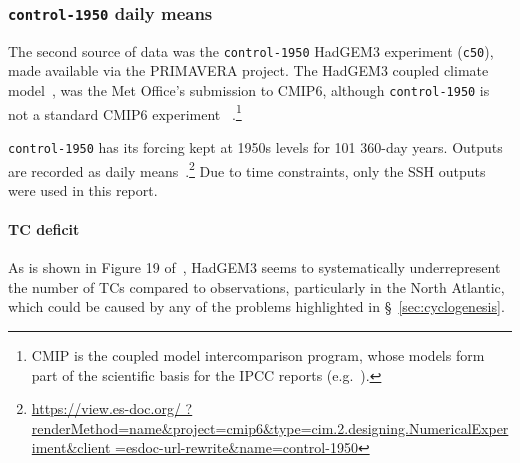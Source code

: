 \subsubsection{\texttt{control-1950} daily means}

\label{sec:control-1950-intro}

The second source of data was the \texttt{control-1950} HadGEM3 experiment (\texttt{c50}),
made available via the PRIMAVERA project.
The HadGEM3 coupled climate model~\cite{williams2018met, FurtherInfo},
 was the Met Office's submission to CMIP6,
although \texttt{control-1950} is not a standard CMIP6 experiment~\cite{eyring2016overview}
.\footnote{CMIP is the coupled model intercomparison program,
whose models form part of the scientific basis for the IPCC
reports (e.g.~\cite{SROCC}).}

\texttt{control-1950} has its forcing kept at
1950s levels for 101 360-day years. Outputs are recorded as daily
means~\cite{williams2018met, FurtherInfo}.\footnote{\url{https://view.es-doc.org/
        ?renderMethod=name&project=cmip6&type=cim.2.designing.NumericalExperiment&client
        =esdoc-url-rewrite&name=control-1950}}
Due to time constraints, only the SSH outputs were used in this report.

\paragraph{TC deficit}
As is shown in Figure 19 of~\cite{williams2018met},
 HadGEM3 seems to systematically underrepresent
 the number of TCs compared to observations,
 particularly in the North Atlantic, which could be caused by any of the
 problems highlighted in §~\ref{sec:cyclogenesis}.

